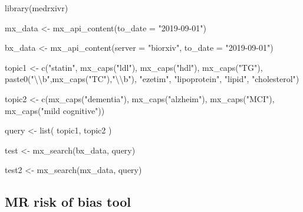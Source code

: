 \documentclass[a4paper, twoside]{templates/ociamthesis}
\newenvironment{Shaded}{\begin{snugshade}}{\end{snugshade}}
\newcommand{\AttributeTok}[1]{\textcolor[rgb]{0.77,0.63,0.00}{#1}}
\newcommand{\FunctionTok}[1]{\textcolor[rgb]{0.00,0.00,0.00}{#1}}
\newcommand{\NormalTok}[1]{#1}
\newcommand{\OtherTok}[1]{\textcolor[rgb]{0.56,0.35,0.01}{#1}}
\newcommand{\SpecialCharTok}[1]{\textcolor[rgb]{0.00,0.00,0.00}{#1}}
\newcommand{\StringTok}[1]{\textcolor[rgb]{0.31,0.60,0.02}{#1}}
\renewenvironment{Shaded}
{
  \vspace{4pt}%
  \begin{snugshade}%
}{%
  \end{snugshade}%
  \vspace{4pt}%
}
\begin{document}
\begin{Shaded}
\begin{Highlighting}[]
\FunctionTok{library}\NormalTok{(medrxivr)}

\NormalTok{mx\_data }\OtherTok{\textless{}{-}} \FunctionTok{mx\_api\_content}\NormalTok{(}\AttributeTok{to\_date =} \StringTok{"2019{-}09{-}01"}\NormalTok{)}

\NormalTok{bx\_data }\OtherTok{\textless{}{-}} \FunctionTok{mx\_api\_content}\NormalTok{(}\AttributeTok{server =} \StringTok{"biorxiv"}\NormalTok{,}
                                    \AttributeTok{to\_date =} \StringTok{"2019{-}09{-}01"}\NormalTok{)}

\NormalTok{topic1 }\OtherTok{\textless{}{-}} \FunctionTok{c}\NormalTok{(}\StringTok{"statin"}\NormalTok{,}
            \FunctionTok{mx\_caps}\NormalTok{(}\StringTok{"ldl"}\NormalTok{),}
            \FunctionTok{mx\_caps}\NormalTok{(}\StringTok{"hdl"}\NormalTok{),}
            \FunctionTok{mx\_caps}\NormalTok{(}\StringTok{"TG"}\NormalTok{),}
            \FunctionTok{paste0}\NormalTok{(}\StringTok{"}\SpecialCharTok{\textbackslash{}\textbackslash{}}\StringTok{b"}\NormalTok{,}\FunctionTok{mx\_caps}\NormalTok{(}\StringTok{"TC"}\NormalTok{),}\StringTok{"}\SpecialCharTok{\textbackslash{}\textbackslash{}}\StringTok{b"}\NormalTok{),}
            \StringTok{"ezetim"}\NormalTok{,}
            \StringTok{"lipoprotein"}\NormalTok{,}
            \StringTok{"lipid"}\NormalTok{,}
            \StringTok{"cholesterol"}\NormalTok{)}

\NormalTok{topic2 }\OtherTok{\textless{}{-}} \FunctionTok{c}\NormalTok{(}\FunctionTok{mx\_caps}\NormalTok{(}\StringTok{"dementia"}\NormalTok{),}
            \FunctionTok{mx\_caps}\NormalTok{(}\StringTok{"alzheim"}\NormalTok{),}
            \FunctionTok{mx\_caps}\NormalTok{(}\StringTok{"MCI"}\NormalTok{),}
            \FunctionTok{mx\_caps}\NormalTok{(}\StringTok{"mild cognitive"}\NormalTok{))}

\NormalTok{query }\OtherTok{\textless{}{-}} \FunctionTok{list}\NormalTok{(}
\NormalTok{  topic1,}
\NormalTok{  topic2}
\NormalTok{)}

\NormalTok{test }\OtherTok{\textless{}{-}} \FunctionTok{mx\_search}\NormalTok{(bx\_data, query)}


\NormalTok{test2 }\OtherTok{\textless{}{-}} \FunctionTok{mx\_search}\NormalTok{(mx\_data, query)}
\end{Highlighting}
\end{Shaded}

\hypertarget{appendix-mr-rob}{%
\subsection{MR risk of bias tool}\label{appendix-mr-rob}}
\end{document}

